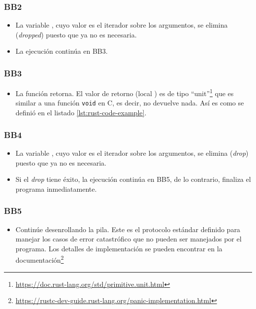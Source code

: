 \subsubsection{BB2}

\begin{itemize}
    \item La variable , cuyo valor es el iterador sobre los argumentos,
          se elimina (\emph{dropped}) puesto que ya no es necesaria.
    \item La ejecución continúa en BB3.
\end{itemize}

\subsubsection{BB3}

\begin{itemize}
    \item La función retorna.
          El valor de retorno (local ) es de tipo ``unit''\footnote{\url{https://doc.rust-lang.org/std/primitive.unit.html}}
          que es similar a una función \texttt{void} en C, es decir, no devuelve nada.
          Así es como se definió  en el listado \ref{lst:rust-code-example}.
\end{itemize}

\subsubsection{BB4}

\begin{itemize}
    \item La variable , cuyo valor es el iterador sobre los argumentos,
          se elimina (\emph{drop}) puesto que ya no es necesaria.
    \item Si el \textit{drop} tiene éxito, la ejecución continúa en BB5,
          de lo contrario, finaliza el programa inmediatamente.
\end{itemize}

\subsubsection{BB5}

\begin{itemize}
    \item Continúe desenrollando la pila. Este es el protocolo estándar definido para manejar los
          casos de error catastrófico que no pueden ser manejados por el programa. Los detalles
          de implementación se pueden encontrar en la documentación\footnote{\url{https://rustc-dev-guide.rust-lang.org/panic-implementation.html}}
\end{itemize}